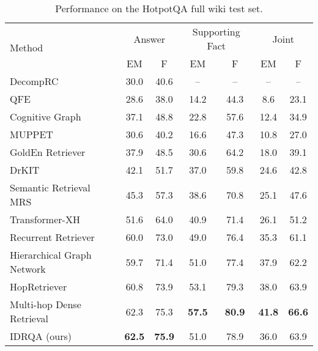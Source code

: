 \documentclass[sigconf]{acmart}
\begin{document}
\setlength\tabcolsep{14pt}
\begin{table*}[]
\centering
\caption{Performance on the HotpotQA full wiki test set.}
\label{table:overall QA performance on test}
\begin{tabular}{@{}lcccccc@{}}
\toprule
\multirow{2}{*}{Method} & \multicolumn{2}{c}{Answer} & \multicolumn{2}{c}{Supporting Fact} & \multicolumn{2}{c}{Joint} \\ \cmidrule(l){2-7} 
 & EM & F & EM & F & EM & F \\ \midrule
DecompRC \citep{min-etal-2019-multi} & 30.0 & 40.6 & -- & -- & -- & -- \\
QFE \citep{nishida-etal-2019-answering} & 28.6 & 38.0 & 14.2 & 44.3 & 8.6 & 23.1 \\
Cognitive Graph \citep{ding-etal-2019-cognitive} & 37.1 & 48.8 & 22.8 & 57.6 & 12.4 & 34.9 \\
MUPPET \citep{feldman-el-yaniv-2019-multi} & 30.6 & 40.2 & 16.6 & 47.3 & 10.8 & 27.0 \\
GoldEn Retriever \citep{qi-etal-2019-answering} & 37.9 & 48.5 & 30.6 & 64.2 & 18.0 & 39.1 \\
DrKIT \citep{Dhingra2020Differentiable} & 42.1 & 51.7 & 37.0 & 59.8 & 24.6 & 42.8 \\
Semantic Retrieval MRS \citep{nie-etal-2019-revealing} & 45.3 & 57.3 & 38.6 & 70.8 & 25.1 & 47.6 \\
Transformer-XH \citep{zhaotransxh2020} & 51.6 & 64.0 & 40.9 & 71.4 & 26.1 & 51.2 \\
Recurrent Retriever \citep{asai2020learning} & 60.0 & 73.0 & 49.0 & 76.4 & 35.3 & 61.1 \\
Hierarchical Graph Network \citep{Fang2019HierarchicalGN} & 59.7 & 71.4 & 51.0 & 77.4 & 37.9 & 62.2 \\
HopRetriever \citep{li2020hopretriever} & 60.8 & 73.9 & 53.1 & 79.3 & 38.0 & 63.9 \\
Multi-hop Dense Retrieval \citep{xiong2021answering} & 62.3 & 75.3 & \textbf{57.5} & \textbf{80.9} & \textbf{41.8} & \textbf{66.6} \\
\midrule
IDRQA (ours) & \textbf{62.5} & \textbf{75.9} & 51.0 & 78.9 & 36.0 & 63.9 \\ \bottomrule
\end{tabular}
\end{table*}
\end{document}
